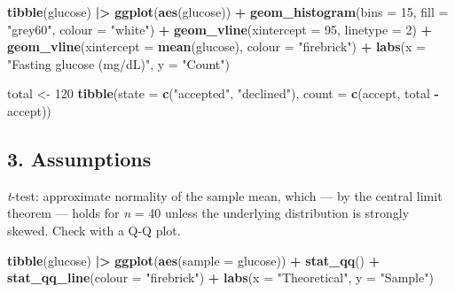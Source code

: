 \documentclass[
]{article}
\newenvironment{Shaded}{\begin{snugshade}}{\end{snugshade}}
\newcommand{\AttributeTok}[1]{\textcolor[rgb]{0.13,0.29,0.53}{#1}}
\newcommand{\DecValTok}[1]{\textcolor[rgb]{0.00,0.00,0.81}{#1}}
\newcommand{\FunctionTok}[1]{\textcolor[rgb]{0.13,0.29,0.53}{\textbf{#1}}}
\newcommand{\NormalTok}[1]{#1}
\newcommand{\OtherTok}[1]{\textcolor[rgb]{0.56,0.35,0.01}{#1}}
\newcommand{\SpecialCharTok}[1]{\textcolor[rgb]{0.81,0.36,0.00}{\textbf{#1}}}
\newcommand{\StringTok}[1]{\textcolor[rgb]{0.31,0.60,0.02}{#1}}
\begin{document}
\begin{Shaded}
\begin{Highlighting}[]
\FunctionTok{tibble}\NormalTok{(glucose) }\SpecialCharTok{|\textgreater{}}
  \FunctionTok{ggplot}\NormalTok{(}\FunctionTok{aes}\NormalTok{(glucose)) }\SpecialCharTok{+}
  \FunctionTok{geom\_histogram}\NormalTok{(}\AttributeTok{bins =} \DecValTok{15}\NormalTok{, }\AttributeTok{fill =} \StringTok{"grey60"}\NormalTok{, }\AttributeTok{colour =} \StringTok{"white"}\NormalTok{) }\SpecialCharTok{+}
  \FunctionTok{geom\_vline}\NormalTok{(}\AttributeTok{xintercept =} \DecValTok{95}\NormalTok{, }\AttributeTok{linetype =} \DecValTok{2}\NormalTok{) }\SpecialCharTok{+}
  \FunctionTok{geom\_vline}\NormalTok{(}\AttributeTok{xintercept =} \FunctionTok{mean}\NormalTok{(glucose), }\AttributeTok{colour =} \StringTok{"firebrick"}\NormalTok{) }\SpecialCharTok{+}
  \FunctionTok{labs}\NormalTok{(}\AttributeTok{x =} \StringTok{"Fasting glucose (mg/dL)"}\NormalTok{, }\AttributeTok{y =} \StringTok{"Count"}\NormalTok{)}
\end{Highlighting}
\end{Shaded}

\begin{Shaded}
\begin{Highlighting}[]
\NormalTok{total  }\OtherTok{\textless{}{-}} \DecValTok{120}
\FunctionTok{tibble}\NormalTok{(}\AttributeTok{state =} \FunctionTok{c}\NormalTok{(}\StringTok{"accepted"}\NormalTok{, }\StringTok{"declined"}\NormalTok{),}
       \AttributeTok{count =} \FunctionTok{c}\NormalTok{(accept, total }\SpecialCharTok{{-}}\NormalTok{ accept))}
\end{Highlighting}
\end{Shaded}

\subsection{3. Assumptions}\label{assumptions}

\emph{t}-test: approximate normality of the sample mean, which --- by
the central limit theorem --- holds for \emph{n} = 40 unless the
underlying distribution is strongly skewed. Check with a Q-Q plot.

\begin{Shaded}
\begin{Highlighting}[]
\FunctionTok{tibble}\NormalTok{(glucose) }\SpecialCharTok{|\textgreater{}}
  \FunctionTok{ggplot}\NormalTok{(}\FunctionTok{aes}\NormalTok{(}\AttributeTok{sample =}\NormalTok{ glucose)) }\SpecialCharTok{+}
  \FunctionTok{stat\_qq}\NormalTok{() }\SpecialCharTok{+} \FunctionTok{stat\_qq\_line}\NormalTok{(}\AttributeTok{colour =} \StringTok{"firebrick"}\NormalTok{) }\SpecialCharTok{+}
  \FunctionTok{labs}\NormalTok{(}\AttributeTok{x =} \StringTok{"Theoretical"}\NormalTok{, }\AttributeTok{y =} \StringTok{"Sample"}\NormalTok{)}
\end{Highlighting}
\end{Shaded}
\end{document}

